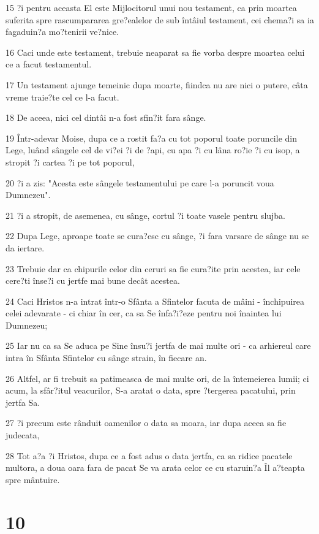 \par 15 ?i pentru aceasta El este Mijlocitorul unui nou testament, ca prin moartea suferita spre rascumpararea gre?ealelor de sub întâiul testament, cei chema?i sa ia fagaduin?a mo?tenirii ve?nice.
\par 16 Caci unde este testament, trebuie neaparat sa fie vorba despre moartea celui ce a facut testamentul.
\par 17 Un testament ajunge temeinic dupa moarte, fiindca nu are nici o putere, câta vreme traie?te cel ce l-a facut.
\par 18 De aceea, nici cel dintâi n-a fost sfin?it fara sânge.
\par 19 Într-adevar Moise, dupa ce a rostit fa?a cu tot poporul toate poruncile din Lege, luând sângele cel de vi?ei ?i de ?api, cu apa ?i cu lâna ro?ie ?i cu isop, a stropit ?i cartea ?i pe tot poporul,
\par 20 ?i a zis: "Acesta este sângele testamentului pe care l-a poruncit voua Dumnezeu".
\par 21 ?i a stropit, de asemenea, cu sânge, cortul ?i toate vasele pentru slujba.
\par 22 Dupa Lege, aproape toate se cura?esc cu sânge, ?i fara varsare de sânge nu se da iertare.
\par 23 Trebuie dar ca chipurile celor din ceruri sa fie cura?ite prin acestea, iar cele cere?ti înse?i cu jertfe mai bune decât acestea.
\par 24 Caci Hristos n-a intrat într-o Sfânta a Sfintelor facuta de mâini - închipuirea celei adevarate - ci chiar în cer, ca sa Se înfa?i?eze pentru noi înaintea lui Dumnezeu;
\par 25 Iar nu ca sa Se aduca pe Sine însu?i jertfa de mai multe ori - ca arhiereul care intra în Sfânta Sfintelor cu sânge strain, în fiecare an.
\par 26 Altfel, ar fi trebuit sa patimeasca de mai multe ori, de la întemeierea lumii; ci acum, la sfâr?itul veacurilor, S-a aratat o data, spre ?tergerea pacatului, prin jertfa Sa.
\par 27 ?i precum este rânduit oamenilor o data sa moara, iar dupa aceea sa fie judecata,
\par 28 Tot a?a ?i Hristos, dupa ce a fost adus o data jertfa, ca sa ridice pacatele multora, a doua oara fara de pacat Se va arata celor ce cu staruin?a Îl a?teapta spre mântuire.

\chapter{10}

